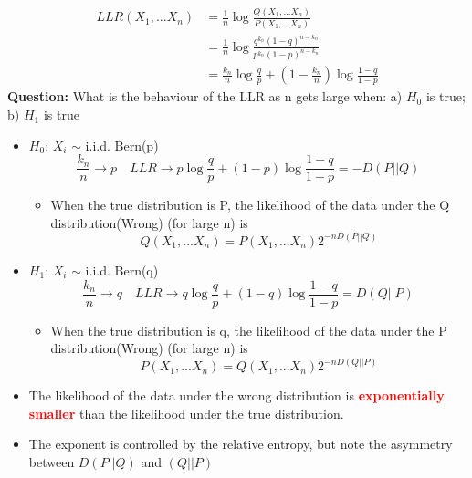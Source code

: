 \documentclass[12pt]{article}
\begin{document}
\begin{align*}
    LLR(X_1,...X_n) &= \frac{1}{n}\log\frac{Q(X_1,...X_n)}{P(X_1,...X_n)}\\
                    &= \frac{1}{n}\log\frac{q^{k_n}(1-q)^{n-k_n}}{p^{k_n}(1-p)^{n-k_n}} \\
                    &= \frac{k_n}{n}\log\frac{q}{p} + \left(1- \frac{k_n}{n}\right)\log\frac{1-q}{1-p}
\end{align*}
\textbf{Question:} What is the behaviour of the LLR as n gets large when: a)  $H_0$ is true; b) $H_1$ is true
\begin{itemize}
    \item $H_0$: $X_i$ $\sim$ i.i.d. Bern(p) 
    \[
    \frac{k_n}{n} \rightarrow p \quad LLR \rightarrow p\log\frac{q}{p} + (1- p)\log\frac{1-q}{1-p} = -D(P||Q)
    \]
    \begin{itemize}
        \item When the true distribution is P, the likelihood of the data under the Q distribution(Wrong) (for large n) is 
        \[
        Q(X_1,...X_n) = P(X_1,...X_n)2^{-nD(P||Q)}
        \]
    \end{itemize}
    \item $H_1$: $X_i$ $\sim$ i.i.d. Bern(q)
    \[
    \frac{k_n}{n} \rightarrow q \quad LLR \rightarrow q\log\frac{q}{p} + (1- q)\log\frac{1-q}{1-p} = D(Q||P)
    \]
    \begin{itemize}
        \item When the true distribution is q, the likelihood of the data under the P distribution(Wrong) (for large n) is 
        \[
        P(X_1,...X_n) = Q(X_1,...X_n)2^{-nD(Q||P)}
        \]
    \end{itemize}
    \item The likelihood of the data under the wrong distribution is \textcolor{red}{\textbf{exponentially smaller}} than the likelihood under the true distribution.
    \item The exponent is controlled by the relative entropy, but note the asymmetry between $D(P||Q)$ and $(Q||P)$
\end{itemize}
    
\end{document}
